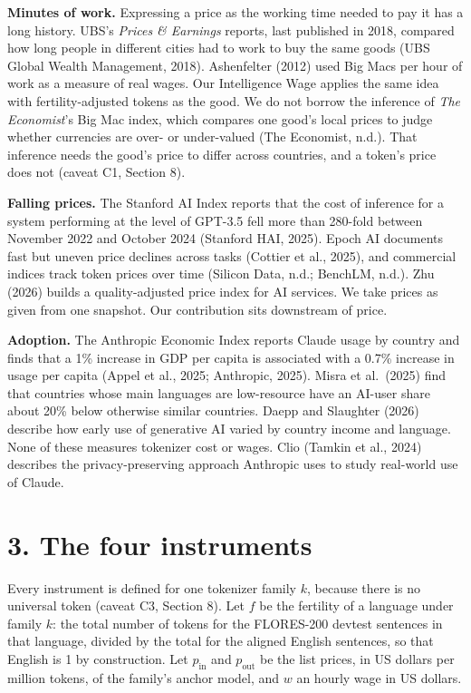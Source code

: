 \documentclass[11pt]{article}
\begin{document}
\textbf{Minutes of work.} Expressing a price as the working time needed to pay it has a long history. UBS's \emph{Prices \& Earnings} reports, last published in 2018, compared how long people in different cities had to work to buy the same goods (UBS Global Wealth Management, 2018). Ashenfelter (2012) used Big Macs per hour of work as a measure of real wages. Our Intelligence Wage applies the same idea with fertility-adjusted tokens as the good. We do not borrow the inference of \emph{The Economist}'s Big Mac index, which compares one good's local prices to judge whether currencies are over- or under-valued (The Economist, n.d.). That inference needs the good's price to differ across countries, and a token's price does not (caveat C1, Section 8).

\textbf{Falling prices.} The Stanford AI Index reports that the cost of inference for a system performing at the level of GPT-3.5 fell more than 280-fold between November 2022 and October 2024 (Stanford HAI, 2025). Epoch AI documents fast but uneven price declines across tasks (Cottier et al., 2025), and commercial indices track token prices over time (Silicon Data, n.d.; BenchLM, n.d.). Zhu (2026) builds a quality-adjusted price index for AI services. We take prices as given from one snapshot. Our contribution sits downstream of price.

\textbf{Adoption.} The Anthropic Economic Index reports Claude usage by country and finds that a 1\% increase in GDP per capita is associated with a 0.7\% increase in usage per capita (Appel et al., 2025; Anthropic, 2025). Misra et al.~(2025) find that countries whose main languages are low-resource have an AI-user share about 20\% below otherwise similar countries. Daepp and Slaughter (2026) describe how early use of generative AI varied by country income and language. None of these measures tokenizer cost or wages. Clio (Tamkin et al., 2024) describes the privacy-preserving approach Anthropic uses to study real-world use of Claude.

\section{3. The four instruments}

Every instrument is defined for one tokenizer family \(k\), because there is no universal token (caveat C3, Section 8). Let \(f\) be the fertility of a language under family \(k\): the total number of tokens for the FLORES-200 devtest sentences in that language, divided by the total for the aligned English sentences, so that English is 1 by construction. Let \(p_{\text{in}}\) and \(p_{\text{out}}\) be the list prices, in US dollars per million tokens, of the family's anchor model, and \(w\) an hourly wage in US dollars.
\end{document}
